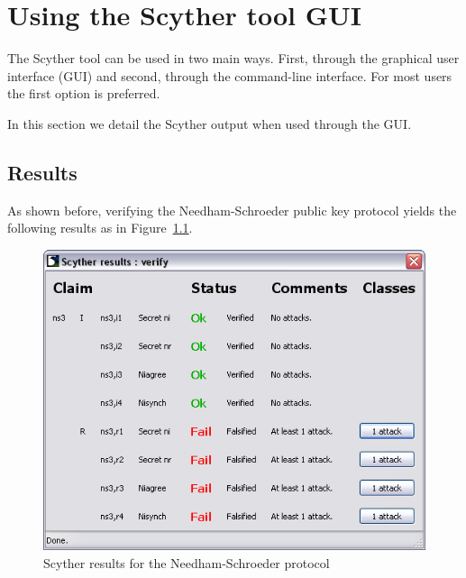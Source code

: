 \documentclass{book}
\begin{document}
\chapter{Using the Scyther tool GUI}
\label{sec:gui}

The Scyther tool can be used in two main ways. First, through the
graphical user interface (GUI) and second, through the command-line
interface. For most users the first option is preferred.

In this section we detail the Scyther output when used through the GUI.

\section{Results}

As shown before, verifying the Needham-Schroeder public key protocol yields the
following results as in Figure~\ref{resultwindowbig}.

\begin{figure}[!htb]
  \begin{center}
    \includegraphics[width=\linewidth]{resultwindow}
  \end{center}
  \label{resultwindowbig}
  \caption{Scyther results for the Needham-Schroeder protocol}
\end{figure}
\end{document}
